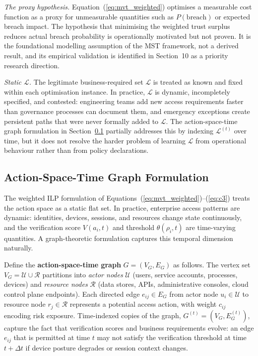 \documentclass[unnumsec,webpdf,contemporary,large]{oup-authoring-template}
\theoremstyle{thmstyleone}
\theoremstyle{thmstyletwo}
\theoremstyle{thmstylethree}
\begin{document}
\begin{appendices}
\textit{The proxy hypothesis.} Equation~(\ref{eq:mvt_weighted}) optimises a
measurable cost function as a proxy for unmeasurable quantities such as
$P(\text{breach})$ or expected breach impact. The hypothesis that minimising
the weighted trust surplus reduces actual breach probability is operationally
motivated but not proven. It is the foundational modelling assumption of the MST
framework, not a derived result, and its empirical validation is identified in
Section~10 as a priority research direction.

\textit{Static $\mathcal{L}$.} The legitimate business-required set $\mathcal{L}$
is treated as known and fixed within each optimisation instance. In practice,
$\mathcal{L}$ is dynamic, incompletely specified, and contested: engineering teams
add new access requirements faster than governance processes can document them, and
emergency exceptions create persistent paths that were never formally added to
$\mathcal{L}$. The action-space-time graph formulation in Section~\ref{app:A4} partially
addresses this by indexing $\mathcal{L}^{(t)}$ over time, but it does not resolve
the harder problem of learning $\mathcal{L}$ from operational behaviour rather than
from policy declarations.



\subsection{Action-Space-Time Graph Formulation}
\label{app:A4}

The weighted ILP formulation of Equations~(\ref{eq:mvt_weighted})--(\ref{eq:c3}) treats the action space as a static flat set.
In practice, enterprise access patterns are dynamic: identities, devices, sessions,
and resources change state continuously, and the verification score $V(a_i, t)$ and
threshold $\theta(\rho_i, t)$ are time-varying quantities. A graph-theoretic
formulation captures this temporal dimension naturally.

Define the \textbf{action-space-time graph} $G = (V_G, E_G)$ as follows. The vertex
set $V_G = \mathcal{U} \cup \mathcal{R}$ partitions into \textit{actor nodes}
$\mathcal{U}$ (users, service accounts, processes, devices) and \textit{resource
nodes} $\mathcal{R}$ (data stores, APIs, administrative consoles, cloud control plane
endpoints). Each directed edge $e_{ij} \in E_G$ from actor node $u_i \in \mathcal{U}$
to resource node $r_j \in \mathcal{R}$ represents a potential access action, with
weight $c_{ij}$ encoding risk exposure. Time-indexed copies of the graph,
$G^{(t)} = (V_G, E_G^{(t)})$, capture the fact that verification scores and
business requirements evolve: an edge $e_{ij}$ that is permitted at time $t$ may
not satisfy the verification threshold at time $t + \Delta t$ if device posture
degrades or session context changes.


\end{appendices}
\end{document}
